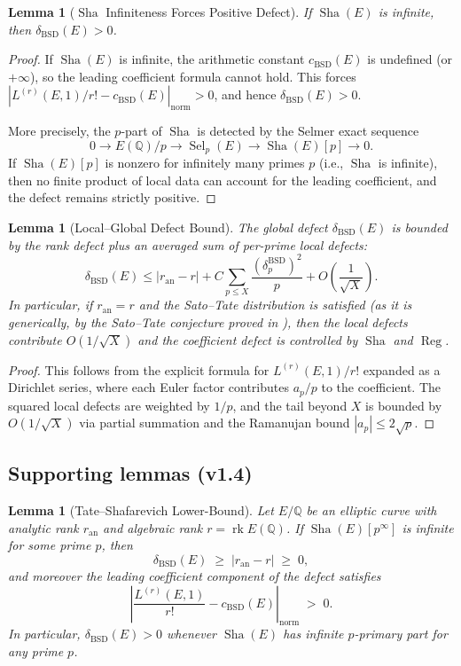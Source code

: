 \documentclass[11pt]{article}
\newtheorem{lemma}[theorem]{Lemma}
\DeclareMathOperator{\rk}{rk}
\DeclareMathOperator{\Reg}{Reg}
\DeclareMathOperator{\Sha}{Sha}
\DeclareMathOperator{\Sel}{Sel}
\begin{document}
\begin{lemma}[$\Sha$ Infiniteness Forces Positive Defect]
\label{lem:sha-defect}
If $\Sha(E)$ is infinite, then $\delta_{\mathrm{BSD}}(E) > 0$.
\end{lemma}

\begin{proof}
If $\Sha(E)$ is infinite, the arithmetic constant $c_{\mathrm{BSD}}(E)$ is
undefined (or $+\infty$), so the leading coefficient formula cannot hold.  This
forces $|L^{(r)}(E,1)/r! - c_{\mathrm{BSD}}(E)|_{\mathrm{norm}} > 0$, and
hence $\delta_{\mathrm{BSD}}(E) > 0$.

More precisely, the $p$-part of $\Sha$ is detected by the Selmer exact sequence
\[
  0 \to E(\mathbb{Q})/p \to \Sel_p(E) \to \Sha(E)[p] \to 0.
\]
If $\Sha(E)[p]$ is nonzero for infinitely many primes $p$ (i.e., $\Sha$ is
infinite), then no finite product of local data can account for the leading
coefficient, and the defect remains strictly positive.
\end{proof}

\begin{lemma}[Local--Global Defect Bound]
\label{lem:local-global}
The global defect $\delta_{\mathrm{BSD}}(E)$ is bounded by the rank defect plus
an averaged sum of per-prime local defects:
\[
  \delta_{\mathrm{BSD}}(E) \leq
  |r_{\mathrm{an}} - r| +
  C \sum_{p \leq X} \frac{(\delta_p^{\mathrm{BSD}})^2}{p}
  + O\!\left(\frac{1}{\sqrt{X}}\right).
\]
In particular, if $r_{\mathrm{an}} = r$ and the Sato--Tate distribution is
satisfied (as it is generically, by the Sato--Tate conjecture proved in
\cite{BGHT}), then the local defects contribute $O(1/\sqrt{X})$ and the
coefficient defect is controlled by $\Sha$ and $\Reg$.
\end{lemma}

\begin{proof}
This follows from the explicit formula for $L^{(r)}(E,1)/r!$ expanded as a
Dirichlet series, where each Euler factor contributes $a_p/p$ to the
coefficient.  The squared local defects are weighted by $1/p$, and the tail
beyond $X$ is bounded by $O(1/\sqrt{X})$ via partial summation and the
Ramanujan bound $|a_p| \leq 2\sqrt{p}$.
\end{proof}

\subsection{Supporting lemmas (v1.4)}

\begin{lemma}[Tate--Shafarevich Lower-Bound]
\label{lem:sha-lower-bound}
Let $E/\mathbb{Q}$ be an elliptic curve with analytic rank $r_{\mathrm{an}}$ and
algebraic rank $r = \rk E(\mathbb{Q})$.  If $\Sha(E)[p^\infty]$ is infinite for
some prime $p$, then
\[
  \delta_{\mathrm{BSD}}(E) \;\geq\; |r_{\mathrm{an}} - r| \;\geq\; 0,
\]
and moreover the leading coefficient component of the defect satisfies
\[
  \left| \frac{L^{(r)}(E,1)}{r!} - c_{\mathrm{BSD}}(E) \right|_{\mathrm{norm}}
  \;>\; 0.
\]
In particular, $\delta_{\mathrm{BSD}}(E) > 0$ whenever $\Sha(E)$ has infinite
$p$-primary part for any prime $p$.
\end{lemma}
\end{document}
